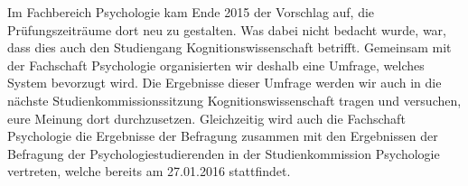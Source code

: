 Im Fachbereich Psychologie kam Ende 2015 der Vorschlag auf, die Prüfungszeiträume dort neu zu gestalten. Was dabei nicht bedacht wurde, war, dass dies auch den Studiengang Kognitionswissenschaft betrifft. Gemeinsam mit der Fachschaft Psychologie organisierten wir deshalb eine Umfrage, welches System bevorzugt wird. Die Ergebnisse dieser Umfrage werden wir auch in die nächste Studienkommissionssitzung Kognitionswissenschaft tragen und versuchen, eure Meinung dort durchzusetzen.
Gleichzeitig wird auch die Fachschaft Psychologie die Ergebnisse der Befragung zusammen mit den Ergebnissen der Befragung der Psychologiestudierenden in der Studienkommission Psychologie vertreten, welche bereits am 27.01.2016 stattfindet. 